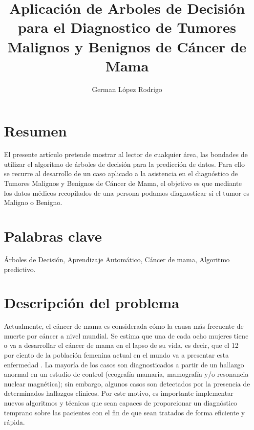 \documentclass[letterpaper, 10 pt, conference]{ieeeconf}
\title{\LARGE \bf Aplicación de Arboles de Decisión para el Diagnostico  de Tumores Malignos y Benignos de Cáncer de Mama}
\author{German López Rodrigo\\}
\begin{document}
\maketitle
\thispagestyle{empty}
\pagestyle{empty}

\section{Resumen}

El presente artículo pretende mostrar al lector de cualquier área, las bondades de utilizar el algoritmo de árboles de decisión para la predicción de datos. Para ello se recurre al desarrollo de un caso aplicado a la asistencia en el diagnóstico de Tumores Malignos y Benignos de Cáncer de Mama, el objetivo es que mediante los datos médicos recopilados de una persona podamos diagnosticar si el tumor es Maligno o Benigno.

\section{Palabras clave}
Árboles de Decisión, Aprendizaje Automático, Cáncer de mama, Algoritmo predictivo.

\section{Descripción del problema}

Actualmente, el cáncer de mama es considerada cómo la causa más frecuente de muerte por cáncer a nivel mundial. Se estima que una de cada ocho mujeres tiene o va a desarrollar el cáncer de mama en el lapso de su vida, es decir, que el 12 por ciento de la población femenina actual en el mundo va a presentar esta enfermedad \cite{1}. La mayoría de los casos son diagnosticados a partir de un hallazgo anormal en un estudio de control (ecografía mamaria, mamografía y/o resonancia nuclear magnética); sin embargo, algunos casos son detectados por la presencia de determinados hallazgos clínicos. Por este motivo, es importante implementar nuevos algoritmos y técnicas que sean capaces de proporcionar un diagnóstico temprano sobre las pacientes con el fin de que sean tratados de forma eficiente y rápida.\\
\end{document}
